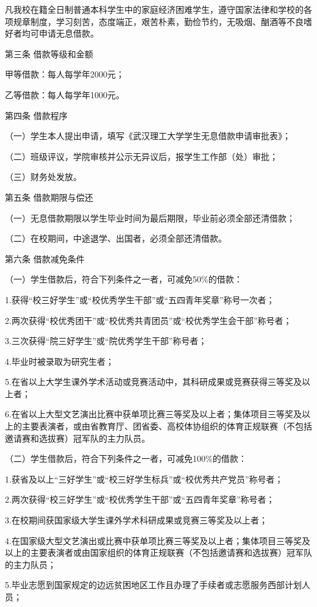 \documentclass[UTF8,12pt,a4paper]{report}
\begin{document}
凡我校在籍全日制普通本科学生中的家庭经济困难学生，遵守国家法律和学校的各项规章制度，学习刻苦，态度端正，艰苦朴素，勤俭节约，无吸烟、酗酒等不良嗜好者均可申请无息借款。

第三条 借款等级和金额

甲等借款：每人每学年2000元；

乙等借款：每人每学年1000元。

第四条 借款程序

（一）学生本人提出申请，填写《武汉理工大学学生无息借款申请审批表》；

（二）班级评议，学院审核并公示无异议后，报学生工作部（处）审批；

（三）财务处发放。

第五条 借款期限与偿还

（一）无息借款期限以学生毕业时间为最后期限，毕业前必须全部还清借款；

（二）在校期间，中途退学、出国者，必须全部还清借款。

第六条 借款减免条件

（一）学生借款后，符合下列条件之一者，可减免50\%的借款：

1.获得“校三好学生”或“校优秀学生干部”或“五四青年奖章”称号一次者；

2.两次获得“校优秀团干”或“校优秀共青团员”或“校优秀学生会干部”称号者；

3.三次获得“院三好学生”或“院优秀学生干部”称号者；

4.毕业时被录取为研究生者；

5.在省以上大学生课外学术活动或竞赛活动中，其科研成果或竞赛获得三等奖及以上者；

6.在省以上大型文艺演出比赛中获单项比赛三等奖及以上者；集体项目三等奖及以上的主要表演者，或由省教育厅、团省委、高校体协组织的体育正规联赛（不包括邀请赛和选拔赛）冠军队的主力队员。

（二）学生借款后，符合下列条件之一者，可减免100\%的借款：

1.获省及以上“三好学生”或“校三好学生标兵”或“校优秀共产党员”称号者；

2.两次获得“校三好学生”或“校优秀学生干部”或“五四青年奖章”称号者；

3.在校期间获国家级大学生课外学术科研成果或竞赛三等奖及以上者；

4.在国家级大型文艺演出或比赛中获单项比赛三等奖及以上者；集体项目三等奖及以上的主要表演者或由国家组织的体育正规联赛（不包括邀请赛和选拔赛）冠军队的主力队员；

5.毕业志愿到国家规定的边远贫困地区工作且办理了手续者或志愿服务西部计划人员；
\end{document}
